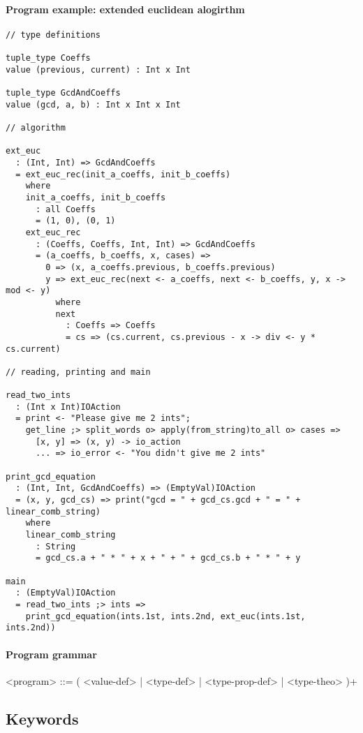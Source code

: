 \documentclass{article}
\begin{document}
\paragraph{Program example: extended euclidean alogirthm}
\begin{verbatim}
// type definitions

tuple_type Coeffs
value (previous, current) : Int x Int

tuple_type GcdAndCoeffs
value (gcd, a, b) : Int x Int x Int

// algorithm

ext_euc
  : (Int, Int) => GcdAndCoeffs
  = ext_euc_rec(init_a_coeffs, init_b_coeffs)
    where
    init_a_coeffs, init_b_coeffs
      : all Coeffs
      = (1, 0), (0, 1)
    ext_euc_rec
      : (Coeffs, Coeffs, Int, Int) => GcdAndCoeffs
      = (a_coeffs, b_coeffs, x, cases) =>
        0 => (x, a_coeffs.previous, b_coeffs.previous)
        y => ext_euc_rec(next <- a_coeffs, next <- b_coeffs, y, x -> mod <- y)
          where
          next
            : Coeffs => Coeffs
            = cs => (cs.current, cs.previous - x -> div <- y * cs.current)

// reading, printing and main

read_two_ints
  : (Int x Int)IOAction
  = print <- "Please give me 2 ints";
    get_line ;> split_words o> apply(from_string)to_all o> cases =>
      [x, y] => (x, y) -> io_action
      ... => io_error <- "You didn't give me 2 ints"
 
print_gcd_equation
  : (Int, Int, GcdAndCoeffs) => (EmptyVal)IOAction
  = (x, y, gcd_cs) => print("gcd = " + gcd_cs.gcd + " = " + linear_comb_string)
    where
    linear_comb_string
      : String
      = gcd_cs.a + " * " + x + " + " + gcd_cs.b + " * " + y

main
  : (EmptyVal)IOAction
  = read_two_ints ;> ints =>
    print_gcd_equation(ints.1st, ints.2nd, ext_euc(ints.1st, ints.2nd))
\end{verbatim}

\paragraph{Program grammar}
\begin{grammar}
<program> ::= ( <value-def> | <type-def> | <type-prop-def> | <type-theo> )+
\end{grammar}

\subsection{Keywords}
\end{document}
